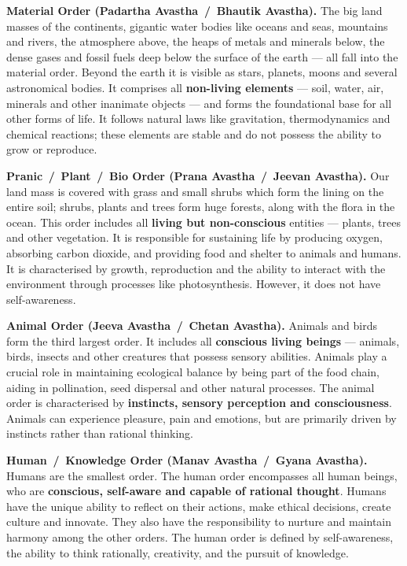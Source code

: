 \begin{apts}
\item \textbf{Material Order (Padartha Avastha \,/\, Bhautik Avastha).} The
      big land masses of the continents, gigantic water bodies like oceans and
      seas, mountains and rivers, the atmosphere above, the heaps of metals
      and minerals below, the dense gases and fossil fuels deep below the
      surface of the earth --- all fall into the material order. Beyond the
      earth it is visible as stars, planets, moons and several astronomical
      bodies. It comprises all \textbf{non-living elements} --- soil, water,
      air, minerals and other inanimate objects --- and forms the foundational
      base for all other forms of life. It follows natural laws like
      gravitation, thermodynamics and chemical reactions; these elements are
      stable and do not possess the ability to grow or reproduce.
\item \textbf{Pranic \,/\, Plant \,/\, Bio Order (Prana Avastha \,/\, Jeevan
      Avastha).} Our land mass is covered with grass and small shrubs which
      form the lining on the entire soil; shrubs, plants and trees form huge
      forests, along with the flora in the ocean. This order includes all
      \textbf{living but non-conscious} entities --- plants, trees and other
      vegetation. It is responsible for sustaining life by producing oxygen,
      absorbing carbon dioxide, and providing food and shelter to animals and
      humans. It is characterised by growth, reproduction and the ability to
      interact with the environment through processes like photosynthesis.
      However, it does not have self-awareness.
\item \textbf{Animal Order (Jeeva Avastha \,/\, Chetan Avastha).} Animals and
      birds form the third largest order. It includes all \textbf{conscious
      living beings} --- animals, birds, insects and other creatures that
      possess sensory abilities. Animals play a crucial role in maintaining
      ecological balance by being part of the food chain, aiding in
      pollination, seed dispersal and other natural processes. The animal
      order is characterised by \textbf{instincts, sensory perception and
      consciousness}. Animals can experience pleasure, pain and emotions, but
      are primarily driven by instincts rather than rational thinking.
\item \textbf{Human \,/\, Knowledge Order (Manav Avastha \,/\, Gyana
      Avastha).} Humans are the smallest order. The human order encompasses
      all human beings, who are \textbf{conscious, self-aware and capable of
      rational thought}. Humans have the unique ability to reflect on their
      actions, make ethical decisions, create culture and innovate. They also
      have the responsibility to nurture and maintain harmony among the other
      orders. The human order is defined by self-awareness, the ability to
      think rationally, creativity, and the pursuit of knowledge.
\end{apts}

